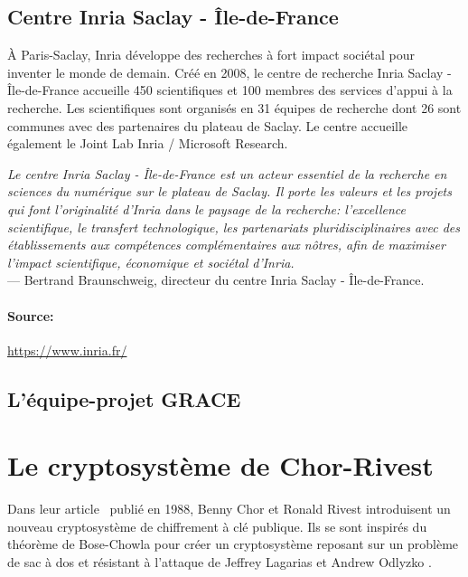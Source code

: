 \documentclass[a4paper, titlepage, 11pt]{article}
\theoremstyle{definition}
\theoremstyle{remark}
\begin{document}
\subsection{Centre Inria Saclay - Île-de-France}

À Paris-Saclay, Inria développe des recherches à fort impact sociétal pour inventer le monde de demain. Créé en 2008, le centre de recherche Inria Saclay - Île-de-France accueille 450 scientifiques et 100 membres des services d’appui à la recherche. Les scientifiques sont organisés en 31 équipes de recherche dont 26 sont communes avec des partenaires du plateau de Saclay. Le centre accueille également le Joint Lab Inria / Microsoft Research.

\textit{\og{}Le centre Inria Saclay - Île-de-France est un acteur essentiel de la recherche en sciences du numérique sur le plateau de Saclay. Il porte les valeurs et les projets qui font l’originalité d’Inria dans le paysage de la recherche: l’excellence scientifique, le transfert technologique, les partenariats pluridisciplinaires avec des établissements aux compétences complémentaires aux nôtres, afin de maximiser l’impact scientifique, économique et sociétal d’Inria.\fg{}} \\
--- Bertrand Braunschweig, directeur du centre Inria Saclay - Île-de-France.

\paragraph{Source:} \url{https://www.inria.fr/}

\subsection{L'équipe-projet GRACE}


\section{Le cryptosystème de Chor-Rivest}\label{sec:cryptosysteme}

Dans leur article~\cite{chorRivest1988} publié en 1988, Benny Chor et Ronald Rivest introduisent un nouveau cryptosystème de chiffrement à clé publique. Ils se sont inspirés du théorème de Bose-Chowla \cite{bose1962} pour créer un cryptosystème reposant sur un problème de sac à dos et résistant à l'attaque de Jeffrey Lagarias et Andrew Odlyzko \cite{lagarias1983}.
\end{document}
